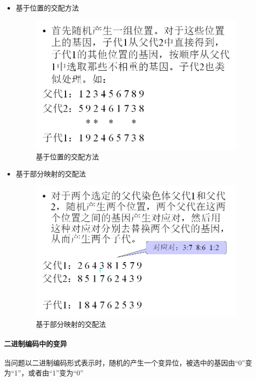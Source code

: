 \documentclass[UTF8,a4paper]{ctexart}
\begin{document}
\begin{itemize}
	\item 基于位置的交配方法
	      \begin{figure}[H]
		      \centering
		      \includegraphics[scale = 0.3]{assets/ArtificialIntelligence/2018-01-09-14-43-36.png}
		      \caption{基于位置的交配方法}
	      \end{figure}
	\item 基于部分映射的交配法
	      \begin{figure}[H]
		      \centering
		      \includegraphics[scale = 0.3]{assets/ArtificialIntelligence/2018-01-09-14-44-05.png}
		      \caption{基于部分映射的交配法 }
	      \end{figure}
\end{itemize}

\paragraph{二进制编码中的变异}当问题以二进制编码形式表示时，随机的产生一个变异位，被选中的基因由“0”变为“1”，或者由“1”变为“0”
\end{document}
